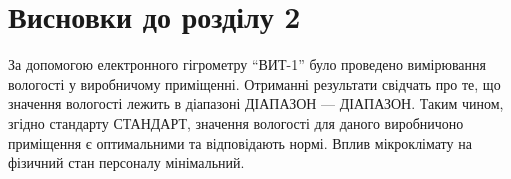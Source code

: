 \section*{Висновки до розділу 2}

За допомогою електронного гігрометру ``ВИТ-1'' було проведено вимірювання вологості у виробничому
приміщенні.  Отриманні результати свідчать про те, що значення вологості лежить в діапазоні ДІАПАЗОН
--- ДІАПАЗОН.  Таким чином, згідно стандарту СТАНДАРТ, значення вологості для даного виробничоно
приміщення є оптимальними та відповідають нормі.  Вплив мікроклімату на фізичний стан персоналу
мінімальний.
